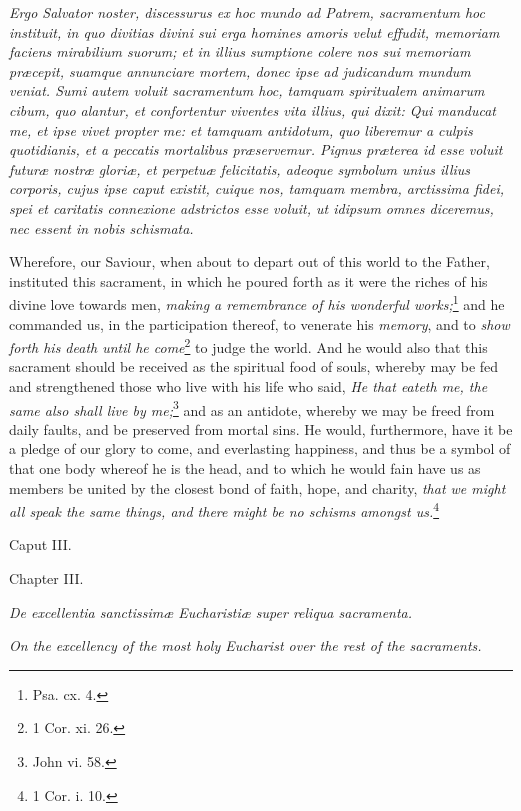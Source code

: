 \emph{Ergo Salvator noster, discessurus ex hoc mundo ad Patrem, sacramentum hoc instituit, in quo divitias divini sui erga homines amoris velut effudit, memoriam faciens mirabilium suorum; et in illius sumptione colere nos sui memoriam præcepit, suamque annunciare mortem, donec ipse ad judicandum mundum veniat. Sumi autem voluit sacramentum hoc, tamquam spiritualem animarum cibum, quo alantur, et confortentur viventes vita illius, qui dixit: Qui manducat me, et ipse vivet propter me: et tamquam antidotum, quo liberemur a culpis quotidianis, et a peccatis mortalibus præservemur. Pignus præterea id esse voluit futuræ nostræ gloriæ, et perpetuæ felicitatis, adeoque symbolum unius illius corporis, cujus ipse caput existit, cuique nos, tamquam membra, arctissima fidei, spei et caritatis connexione adstrictos esse voluit, ut idipsum omnes diceremus, nec essent in nobis schismata.}

Wherefore, our Saviour, when about to depart out of this world to the Father, instituted this sacrament, in which he poured forth as it were the riches of his divine love towards men, \emph{making a remembrance of his wonderful works;}\footnote{\par   Psa. cx. 4.} and he commanded us, in the participation thereof, to venerate his \emph{memory}, and to \emph{show forth his death until he come}\footnote{\par   1 Cor. xi. 26.} to judge the world. And he would also that this sacrament should be received as the spiritual food of souls, whereby may be fed and strengthened those who live with his life who said, \emph{He that eateth me, the same also shall live by me;}\footnote{\par   John vi. 58.} and as an antidote, whereby we may be freed from daily faults, and be preserved from mortal sins. He would, furthermore, have it be a pledge of our glory to come, and everlasting happiness, and thus be a symbol of that one body whereof he is the head, and to which he would fain have us as members be united by the closest bond of faith, hope, and charity, \emph{that we might all speak the same things, and there might be no schisms amongst us.}\footnote{\par   1 Cor. i. 10.}

Caput III.

Chapter III.

\emph{De excellentia sanctissimæ Eucharistiæ super reliqua sacramenta.}

\emph{On the excellency of the most holy Eucharist over the rest of the sacraments.}

